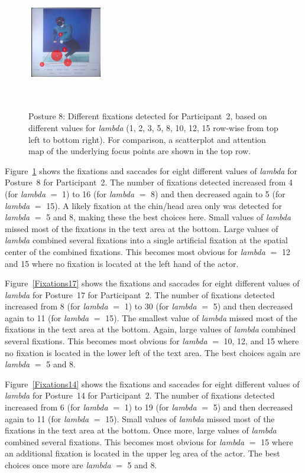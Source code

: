 \documentclass[11pt]{asaproc}
\begin{document}
\begin{figure}[t]
\begin{center}
\includegraphics[width=0.30\textwidth]{figures/Subject13_scanpath_posture8_lambda_15.jpg}
\end{center} ~\\[-1.5cm]
\caption{\label{Fixations8}Posture 8: Different fixations detected for Participant~2, based on different values
for {\it lambda} (1, 2, 3, 5, 8, 10, 12, 15 row-wise from top left to bottom right). For comparison,
a scatterplot and attention map of the underlying focus points are shown in the top row.}
\end{figure}


Figure~\ref{Fixations8} shows the fixations and saccades for eight different values of {\it lambda} for
Posture~8 for Participant~2. The number of fixations detected increased from 4 (for {\it lambda} $=$ 1)
to 16 (for {\it lambda} $=$ 8) and then decreased again to 5 (for {\it lambda} $=$ 15). 
A likely fixation at the chin/head area only was detected for {\it lambda} $=$ 5 and 8,
making these the best choices here.
Small values of {\it lambda} missed most of the fixations in the text area at the bottom.
Large values of {\it lambda} combined several fixations into a single artificial fixation
at the spatial center of the combined fixations. This becomes most obvious
for {\it lambda} $=$ 12 and 15 where no fixation is located at the left hand of the actor.

Figure~\ref{Fixations17} shows the fixations and saccades for eight different values of {\it lambda} for
Posture~17 for Participant~2. The number of fixations detected increased from 8 (for {\it lambda} $=$ 1)
to 30 (for {\it lambda} $=$ 5) and then decreased again to 11 (for {\it lambda} $=$ 15). 
The smallest value of {\it lambda} missed most of the fixations in the text area at the bottom.
Again, large values of {\it lambda} combined several fixations. This becomes most obvious
for {\it lambda} $=$ 10, 12, and 15 where no fixation is located in the lower left of the text area.
The best choices again are {\it lambda} $=$ 5 and 8.

Figure~\ref{Fixations14} shows the fixations and saccades for eight different values of {\it lambda} for
Posture~14 for Participant~2. The number of fixations detected increased from 6 (for {\it lambda} $=$ 1)
to 19 (for {\it lambda} $=$ 5) and then decreased again to 11 (for {\it lambda} $=$ 15). 
Small values of {\it lambda} missed most of the fixations in the text area at the bottom.
Once more, large values of {\it lambda} combined several fixations. This becomes most obvious
for {\it lambda} $=$ 15 where an additional fixation is located in the upper leg area of the actor.
The best choices once more are {\it lambda} $=$ 5 and 8.
\end{document}
